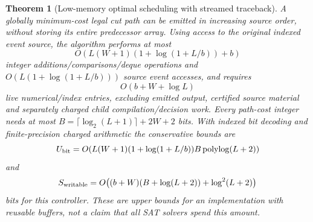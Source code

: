 \documentclass[11pt]{article}
\newtheorem{theorem}{Theorem}
\begin{document}
\begin{theorem}[Low-memory optimal scheduling with streamed traceback]
A globally minimum-cost legal cut path can be \emph{emitted in increasing source order}, without storing its entire predecessor array. Using access to the original indexed event source, the algorithm performs at most
\[
O\!\left(L(W+1)\left(1+\log(1+L/b)\right)+b\right)
\]
integer additions/comparisons/deque operations and $O(L(1+\log(1+L/b)))$ source event accesses, and requires
\[
O(b+W+\log L)
\]
live numerical/index entries, excluding emitted output, certified source material and separately charged child compilation/decision work.
Every path-cost integer needs at most $B=\lceil\log_2(L+1)\rceil+2W+2$ bits. With indexed bit decoding and finite-precision charged arithmetic the conservative bounds are
\[
U_{\rm bit}=O\!\left(L(W+1)(1+\log(1+L/b))B\operatorname{polylog}(L+2)\right)
\]
and
\[
S_{\rm writable}=O\!\left((b+W)(B+\log(L+2))+\log^2(L+2)\right)
\]
bits for this controller. These are upper bounds for an implementation with reusable buffers, not a claim that all SAT solvers spend this amount.
\end{theorem}
\end{document}
